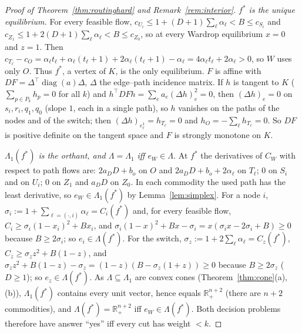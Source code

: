 \documentclass[11pt,a4paper]{article}
\theoremstyle{plain}
\theoremstyle{definition}
\theoremstyle{remark}
\newcommand{\R}{\mathbb{R}}
\newcommand{\Lam}{\Lambda}
\newcommand{\Lone}{\Lambda_{1}}
\begin{document}
\begin{proof}[Proof of Theorem~\ref{thm:routinghard} and Remark~\ref{rem:interior}]
\emph{$f^*$ is the unique equilibrium.} For every feasible flow, $c_{U_i}\le1+(D+1)\sum_\ell\alpha_\ell<B\le c_{S_i}$ and $c_{Z_1}\le1+2(D+1)\sum_\ell\alpha_\ell<B\le c_{Z_0}$, so at every Wardrop equilibrium $x=0$ and $z=1$. Then $c_{T_\ell}-c_O=\alpha_\ell t_\ell+\alpha_\ell(t_\ell+1)+2\alpha_\ell(t_\ell+1)-\alpha_\ell=4\alpha_\ell t_\ell+2\alpha_\ell>0$, so $W$ uses only $O$. Thus $f^*$, a vertex of $K$, is the only equilibrium. $F$ is affine with $DF=\Delta^{\!\top}\operatorname{diag}(a)\Delta$, $\Delta$ the edge--path incidence matrix. If $h$ is tangent to $K$ ($\sum_{p\in P_k}h_p=0$ for all $k$) and $h^{\!\top}DFh=\sum_ea_e(\Delta h)_e^2=0$, then $(\Delta h)_e=0$ on $s_i,r_i,q_1,q_0$ (slope $1$, each in a single path), so $h$ vanishes on the paths of the nodes and of the switch; then $(\Delta h)_{e^1_\ell}=h_{T_\ell}=0$ and $h_O=-\sum_\ell h_{T_\ell}=0$. So $DF$ is positive definite on the tangent space and $F$ is strongly monotone on $K$.

\emph{$\Lone(f^*)$ is the orthant, and $\Lam=\Lone$ iff $e_W\in\Lam$.} At $f^*$ the derivatives of $C_W$ with respect to path flows are: $2a_DD+b_o$ on $O$ and $2a_DD+b_o+2\alpha_\ell$ on $T_\ell$; $0$ on $S_i$ and on $U_i$; $0$ on $Z_1$ and $a_DD$ on $Z_0$. In each commodity the used path has the least derivative, so $e_W\in\Lone(f^*)$ by Lemma~\ref{lem:simplex}. For a node $i$, $\sigma_i:=1+\sum_{\ell=(\cdot,i)}\alpha_\ell=C_i(f^*)$ and, for every feasible flow, $C_i\ge\sigma_i(1-x_i)^2+Bx_i$, and $\sigma_i(1-x)^2+Bx-\sigma_i=x(\sigma_ix-2\sigma_i+B)\ge0$ because $B\ge2\sigma_i$; so $e_i\in\Lam(f^*)$. For the switch, $\sigma_z:=1+2\sum_\ell\alpha_\ell=C_z(f^*)$, $C_z\ge\sigma_zz^2+B(1-z)$, and $\sigma_zz^2+B(1-z)-\sigma_z=(1-z)(B-\sigma_z(1+z))\ge0$ because $B\ge2\sigma_z$ ($D\ge1$); so $e_z\in\Lam(f^*)$. As $\Lam\subseteq\Lone$ are convex cones (Theorem~\ref{thm:cone}(a),(b)), $\Lone(f^*)$ contains every unit vector, hence equals $\R^{n+2}_+$ (there are $n+2$ commodities), and $\Lam(f^*)=\R^{n+2}_+$ iff $e_W\in\Lam(f^*)$. Both decision problems therefore have answer ``yes'' iff every cut has weight $<k$.
\end{proof}
\end{document}
